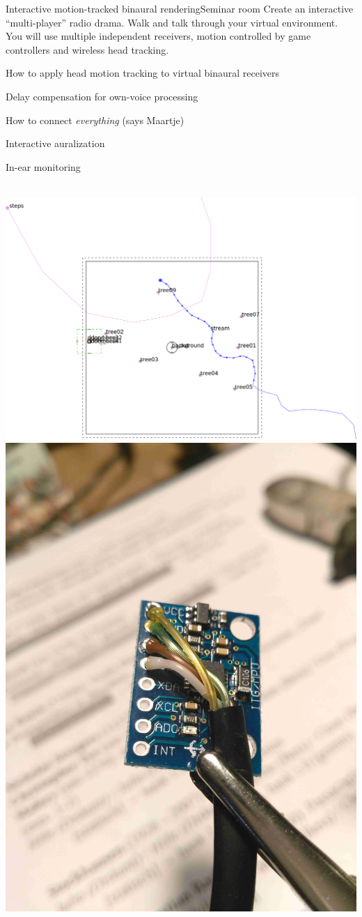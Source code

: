 \documentclass[11pt,a4paper,twoside]{article}
\begin{document}
\setcounter{tutorial}{5}
\begin{tutorial}{Interactive motion-tracked binaural rendering}{Seminar room}
  Create an interactive ``multi-player'' radio drama.
  Walk and talk through your virtual environment.  
  You will use multiple independent receivers, motion controlled by
  game controllers and wireless head tracking.

\begin{learnitems}
\item How to apply head motion tracking to virtual binaural receivers
\item Delay compensation for own-voice processing
\item How to connect {\em everything} (says Maartje)
\end{learnitems}

\begin{appitems}
\item Interactive auralization
\item In-ear monitoring
\end{appitems}

~\includegraphics[width=0.6\columnwidth]{t6_map.pdf}\hfill\includegraphics[width=0.35\columnwidth,trim=0 0 0 1800px]{mpu6050.jpg}~

\end{tutorial}
\end{document}
